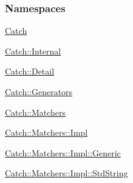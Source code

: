 \subsubsection*{Namespaces}
\begin{DoxyCompactItemize}
\item 
 \hyperlink{a00117}{Catch}
\item 
 \hyperlink{a00120}{Catch\+::\+Internal}
\item 
 \hyperlink{a00118}{Catch\+::\+Detail}
\item 
 \hyperlink{a00119}{Catch\+::\+Generators}
\item 
 \hyperlink{a00121}{Catch\+::\+Matchers}
\item 
 \hyperlink{a00122}{Catch\+::\+Matchers\+::\+Impl}
\item 
 \hyperlink{a00123}{Catch\+::\+Matchers\+::\+Impl\+::\+Generic}
\item 
 \hyperlink{a00124}{Catch\+::\+Matchers\+::\+Impl\+::\+Std\+String}
\end{DoxyCompactItemize}

